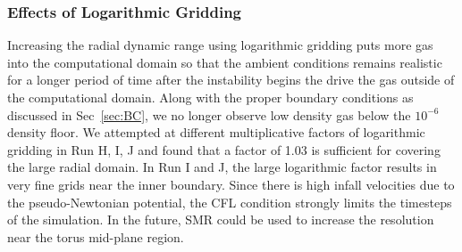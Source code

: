 \documentclass[iop,revtex4]{emulateapj}
\begin{document}
\subsubsection{Effects of Logarithmic Gridding}
\par  Increasing the radial dynamic range using logarithmic gridding puts more gas into the computational domain so that the ambient conditions remains realistic for a longer period of time after the instability begins the drive the gas outside of the computational domain. Along with the proper boundary conditions as discussed in Sec~\ref{sec:BC}, we no longer observe low density gas below the $10^{-6}$ density floor. We attempted at different multiplicative factors of logarithmic gridding in Run H, I, J and found that a factor of 1.03 is sufficient for covering the large radial domain. In Run I and J, the large logarithmic factor results in very fine grids near the inner boundary. Since there is high infall velocities due to the pseudo-Newtonian potential, the CFL condition strongly limits the timesteps of the simulation. In the future, \ac{SMR} could be used to increase the resolution near the torus mid-plane region.
\end{document}
